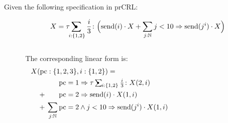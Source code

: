 \begin{block}{\large {}\vphantom{Introduction}}
Given the following specification in prCRL:

\[\ \ \ \ \ \ X = \tau \!\!\psum_{i : \{1,2\}} \frac{i}{3} \colon \Big(\text{send}(i) \cdot X + \sum_{j:\mathbb{N}} j < 10 \Rightarrow \text{send}(j^i)\cdot X \Big)\]

\begin{columns}
\begin{column}{0.02\linewidth}\end{column}
\begin{column}{.55\linewidth}

\noindent \!\!\!\!The corresponding linear form is:
\begin{align*}
&X({\color{blue!70!black}\text{pc} : \{1,2,3\}, i:\{1,2\}}) = \\
& \quad \phantom{{}+{}} \hphantom{{}\sum_{j : \mathbb{N}}{}}{\color{blue!70!black}\text{pc} = 1} \Rightarrow \textstyle \tau \psum_{i:\{1,2\}} \frac{i}{3} \colon X({\color{blue!70!black}2, i})\\
& \quad {}+{} \hphantom{{}\sum_{j : \mathbb{N}}{}}{\color{blue!70!black}\text{pc} = 2} \Rightarrow \text{send}(i) \cdot X({\color{blue!70!black}1}, i)\\
& \quad {}+{} \sum_{j : \mathbb{N}} {\color{blue!70!black}\text{pc} = 2} \wedge j < 10 \Rightarrow \text{send}(j^i) \cdot X({\color{blue!70!black}1}, i)
\end{align*}

\end{column}


\begin{column}{.35\linewidth}
\begin{figure}
\end{figure}
\end{column}
\begin{column}{0.02\linewidth}\end{column}
\end{columns}


\end{block}
